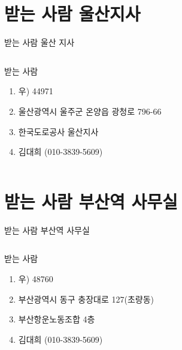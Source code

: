 \documentclass[aspectratio=1610,12pt,xcolor=pdftex,dvipsnames,table,handout]{beamer}
\begin{document}
		\section{받는 사람 울산지사}
		\begin{frame}[c,plain]{받는 사람 울산 지사}

		\begin{columns}[t]
		\begin{column}{1.0\textwidth}

			\begin{block} {받는 사람}
			\begin{enumerate}
			\item [] 우) 44971
			\item [] 울산광역시 울주군 온양읍 광청로 796-66
			\item [] 한국도로공사 울산지사 
			\item [] 김대희 (010-3839-5609)
			\end{enumerate}
			\end{block}
		\end{column}
		\end{columns}

		\end{frame}



		\section{받는 사람 부산역 사무실}
		\begin{frame}[c,plain]{받는 사람 부산역 사무실}

		\begin{columns}[t]
		\begin{column}{1.0\textwidth}

			\begin{block} {받는 사람}
			\begin{enumerate}
			\item [] 우) 48760
			\item [] 부산광역시 동구 충장대로 127(초량동)
			\item [] 부산항운노동조합 4층
			\item [] 김대희 (010-3839-5609)
			\end{enumerate}
			\end{block}
		\end{column}
		\end{columns}

		\end{frame}
\end{document}
